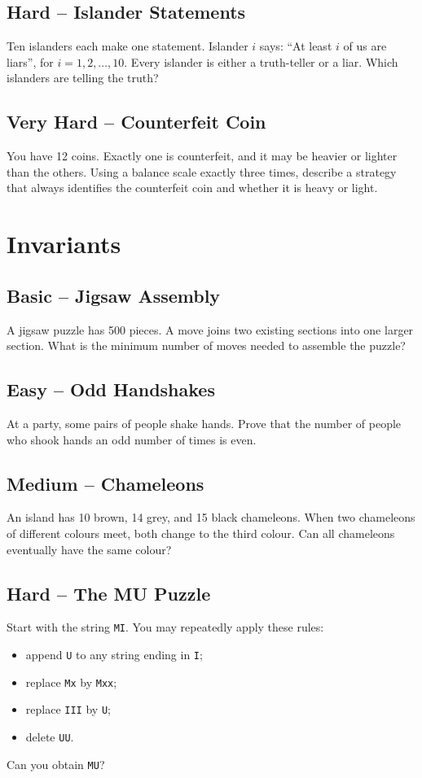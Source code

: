 \documentclass[12pt]{article}
\begin{document}
\subsection*{Hard -- Islander Statements}
Ten islanders each make one statement. Islander $i$ says: ``At least
$i$ of us are liars'', for $i=1,2,\ldots,10$. Every islander is
either a truth-teller or a liar. Which islanders are telling the truth?

\subsection*{Very Hard -- Counterfeit Coin}
You have 12 coins. Exactly one is counterfeit, and it may be heavier
or lighter than the others. Using a balance scale exactly three
times, describe a strategy that always identifies the counterfeit
coin and whether it is heavy or light.

\section{Invariants}

\subsection*{Basic -- Jigsaw Assembly}
A jigsaw puzzle has 500 pieces. A move joins two existing sections
into one larger section. What is the minimum number of moves needed
to assemble the puzzle?

\subsection*{Easy -- Odd Handshakes}
At a party, some pairs of people shake hands. Prove that the number
of people who shook hands an odd number of times is even.

\subsection*{Medium -- Chameleons}
An island has 10 brown, 14 grey, and 15 black chameleons. When two
chameleons of different colours meet, both change to the third
colour. Can all chameleons eventually have the same colour?

\subsection*{Hard -- The MU Puzzle}
Start with the string \texttt{MI}. You may repeatedly apply these rules:
\begin{itemize}
    \item append \texttt{U} to any string ending in \texttt{I};
    \item replace \texttt{Mx} by \texttt{Mxx};
    \item replace \texttt{III} by \texttt{U};
    \item delete \texttt{UU}.
\end{itemize}
Can you obtain \texttt{MU}?
\end{document}

